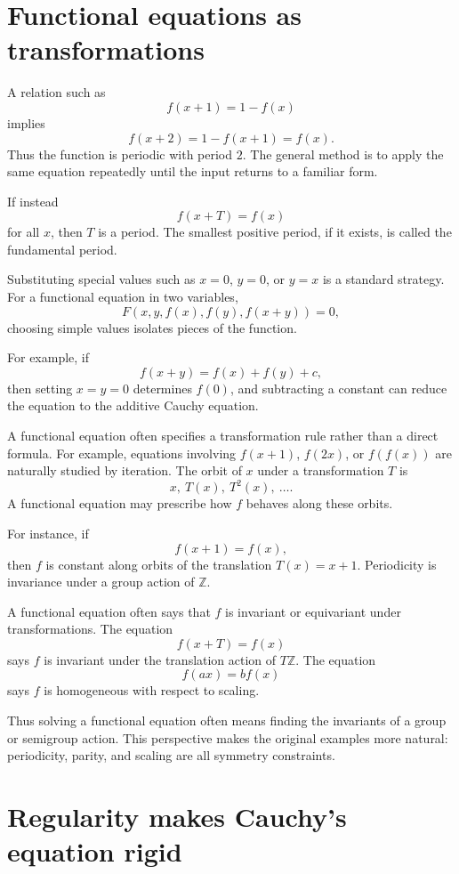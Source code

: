 \section{Functional equations as transformations}

A relation such as
\[
  f(x+1)=1-f(x)
\]
implies
\[
  f(x+2)=1-f(x+1)=f(x).
\]
Thus the function is periodic with period $2$.  The general method is to apply the same equation repeatedly until the input returns to a familiar form.

If instead
\[
  f(x+T)=f(x)
\]
for all $x$, then $T$ is a period.  The smallest positive period, if it exists, is called the fundamental period.

Substituting special values such as $x=0$, $y=0$, or $y=x$ is a standard strategy.  For a functional equation in two variables,
\[
  F(x,y,f(x),f(y),f(x+y))=0,
\]
choosing simple values isolates pieces of the function.

For example, if
\[
  f(x+y)=f(x)+f(y)+c,
\]
then setting $x=y=0$ determines $f(0)$, and subtracting a constant can reduce the equation to the additive Cauchy equation.

A functional equation often specifies a transformation rule rather than a direct formula.  For example, equations involving $f(x+1)$, $f(2x)$, or $f(f(x))$ are naturally studied by iteration.  The orbit of $x$ under a transformation $T$ is
\[
  x,\ T(x),\ T^2(x),\ \ldots.
\]
A functional equation may prescribe how $f$ behaves along these orbits.

For instance, if
\[
  f(x+1)=f(x),
\]
then $f$ is constant along orbits of the translation $T(x)=x+1$.  Periodicity is invariance under a group action of $\mathbb Z$.

A functional equation often says that $f$ is invariant or equivariant under transformations.  The equation
\[
  f(x+T)=f(x)
\]
says $f$ is invariant under the translation action of $T\mathbb Z$.  The equation
\[
  f(ax)=bf(x)
\]
says $f$ is homogeneous with respect to scaling.

Thus solving a functional equation often means finding the invariants of a group or semigroup action.  This perspective makes the original examples more natural: periodicity, parity, and scaling are all symmetry constraints.

\section{Regularity makes Cauchy's equation rigid}

